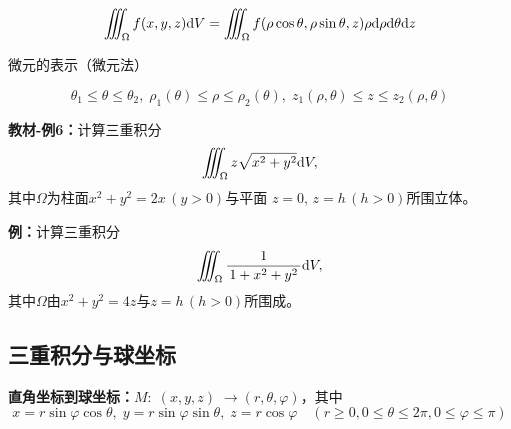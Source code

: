 $${\iiint_{\Omega}f(x,y,z)\mathrm{d}
V=\iiint_{\Omega}f(\rho\cos\theta,\rho\sin\theta,z)\rho 
\mathrm{d}\rho \mathrm{d}\theta \mathrm{d} z}$$

微元的表示（微元法）

\begin{center}
\end{center}

$$\theta_1\leq\theta\leq\theta_2,\;
\rho_1(\theta)\leq\rho\leq\rho_2(\theta),\;
z_1(\rho,\theta)\leq z\leq z_2(\rho,\theta)$$

{\bf 教材-例6：}计算三重积分
$$\iiint_{\Omega}z\sqrt{x^2+y^2}\mathrm{d} V,$$
其中$\Omega$为柱面$x^2+y^2=2x\,(y>0)$与平面
$z=0,\,z=h\,(h>0)$所围立体。

{\bf 例：}计算三重积分
$$\iiint_{\Omega}\displaystyle\frac{\,{1}\,}{\,{1+x^2+y^2}\,}\mathrm{d} V,$$
其中$\Omega$由$x^2+y^2=4z$与$z=h\,(h>0)$所围成。

\subsection{三重积分与球坐标}

{\bf 直角坐标到球坐标：}$M:\;(x,y,z)\;\to(r,\theta,\varphi)$，其中
$$x=r\sin\varphi\cos\theta,\;y=r\sin\varphi\sin\theta,\;z=r\cos\varphi
\quad(r\geq 0,0\leq\theta\leq 2\pi,0\leq\varphi\leq\pi)$$

